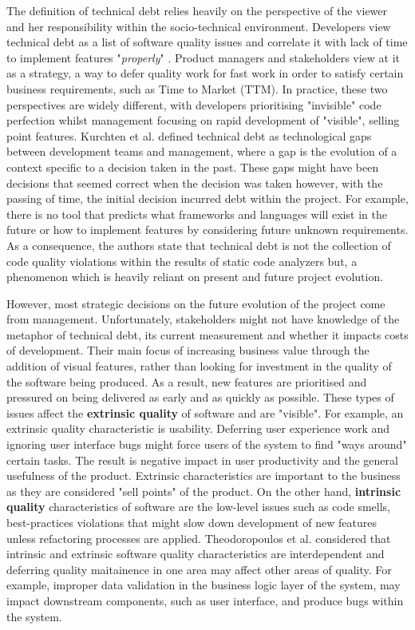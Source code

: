 \documentclass{mprop}
\begin{document}
The definition of technical debt relies heavily on the perspective of the viewer and her responsibility within the socio-technical environment.
Developers view technical debt as a list of software quality issues and correlate it with lack of time to implement features "\textit{properly}" \cite{Codabux2013}.
Product managers and stakeholders view at it as a strategy, a way to defer quality work for fast work in order to satisfy certain business requirements, such as Time to Market (TTM).
In practice, these two perspectives are widely different, with developers prioritising "invisible" code perfection whilst management focusing on rapid development of "visible", selling point features.
Kurchten et al. \cite{Kruchten2012} defined technical debt as technological gaps between development teams and management, where a gap is the evolution of a context specific to a decision taken in the past.
These gaps might have been decisions that seemed correct when the decision was taken however, with the passing of time, the initial decision incurred debt within the project.
For example, there is no tool that predicts what frameworks and languages will exist in the future or how to implement features by considering future unknown requirements.
As a consequence, the authors state that technical debt is not the collection of code quality violations within the results of static code analyzers but, a phenomenon which is heavily reliant on present and future project evolution.


However, most strategic decisions on the future evolution of the project come from management.
Unfortunately, stakeholders might not have knowledge of the metaphor of technical debt, its current measurement and whether it impacts costs of development.
Their main focus of increasing business value through the addition of visual features, rather than looking for investment in the quality of the software being produced.
As a result, new features are prioritised and pressured on being delivered as early and as quickly as possible.
These types of issues affect the \textbf{extrinsic quality} of software and are "visible".
For example, an extrinsic quality characteristic is usability.
Deferring user experience work and ignoring user interface bugs might force users of the system to find "ways around" certain tasks.
The result is negative impact in user productivity and the general usefulness of the product.
Extrinsic characteristics are important to the business as they are considered "sell points" of the product.
On the other hand, \textbf{intrinsic quality} characteristics of software are the low-level issues such as code smells, best-practices violations that might slow down development of new features unless refactoring processes are applied.
Theodoropoulos et al. \cite{Theodoropoulos2011} considered that intrinsic and extrinsic software quality characteristics are interdependent and deferring quality maitainence in one area may affect other areas of quality.
For example, improper data validation in the business logic layer of the system, may impact downstream components, such as user interface, and produce bugs within the system.
\end{document}

